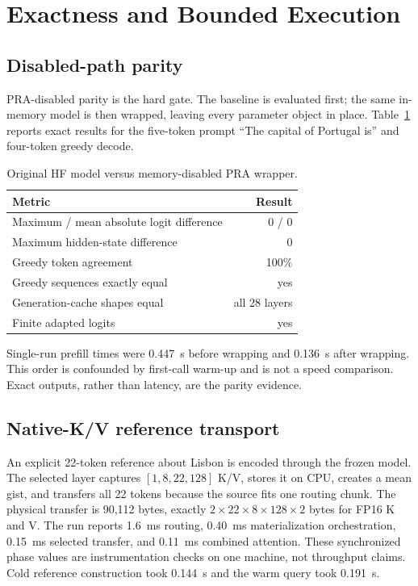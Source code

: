 \documentclass[11pt]{article}
\begin{document}
\section{Exactness and Bounded Execution}

\subsection{Disabled-path parity}

PRA-disabled parity is the hard gate. The baseline is evaluated first; the same in-memory model
is then wrapped, leaving every parameter object in place. Table~\ref{tab:parity} reports exact
results for the five-token prompt ``The capital of Portugal is'' and four-token greedy decode.

\begin{table}[H]
\centering
\caption{Original HF model versus memory-disabled PRA wrapper.}
\label{tab:parity}
\begin{tabular}{lr}
\toprule
Metric & Result \\
\midrule
Maximum / mean absolute logit difference & 0 / 0 \\
Maximum hidden-state difference & 0 \\
Greedy token agreement & 100\% \\
Greedy sequences exactly equal & yes \\
Generation-cache shapes equal & all 28 layers \\
Finite adapted logits & yes \\
\bottomrule
\end{tabular}
\end{table}

Single-run prefill times were 0.447~s before wrapping and 0.136~s after wrapping. This order is
confounded by first-call warm-up and is not a speed comparison. Exact outputs, rather than
latency, are the parity evidence.

\subsection{Native-K/V reference transport}

An explicit 22-token reference about Lisbon is encoded through the frozen model. The selected
layer captures $[1,8,22,128]$ K/V, stores it on CPU, creates a mean gist, and transfers all 22
tokens because the source fits one routing chunk. The physical transfer is 90,112 bytes, exactly
$2\times22\times8\times128\times2$ bytes for FP16 K and V. The run reports 1.6~ms routing,
0.40~ms materialization orchestration, 0.15~ms selected transfer, and 0.11~ms combined attention.
These synchronized phase values are instrumentation checks on one machine, not throughput
claims. Cold reference construction took 0.144~s and the warm query took 0.191~s.
\end{document}
